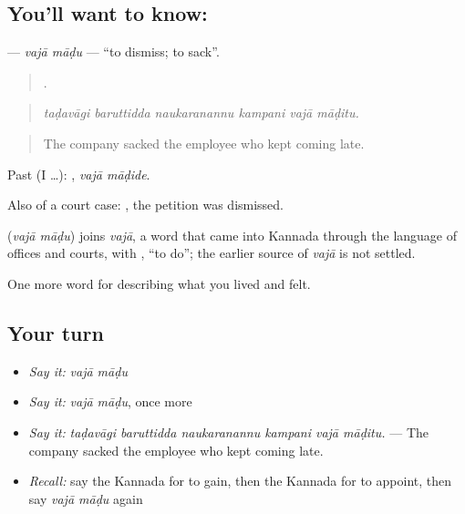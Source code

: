 \subsection*{You'll want to know:  }
\textbf{ } — \emph{vajā māḍu} — \textquotedblleft{}to dismiss; to sack\textquotedblright{}.

\begin{quote}
     .
\end{quote}

\begin{quote}
\emph{taḍavāgi baruttidda naukaranannu kampani vajā māḍitu.}
\end{quote}

\begin{quote}
The company sacked the employee who kept coming late.
\end{quote}

Past (I …):  , \emph{vajā māḍide}.

Also of a court case:   , the petition was dismissed.

\begin{cousinweb}
\textbf{ } (\emph{vajā māḍu}) joins \emph{vajā}, a word that came into Kannada through the language of offices and courts, with , \textquotedblleft{}to do\textquotedblright{}; the earlier source of \emph{vajā} is not settled.
\end{cousinweb}

\begin{grammarlens}[title={What you've built}]
One more word for describing what you lived and felt.
\end{grammarlens}

\subsection*{Your turn}
\begin{itemize}
\raggedright
  \item \emph{Say it:} \emph{vajā māḍu}
  \item \emph{Say it:} \emph{vajā māḍu}, once more
  \item \emph{Say it:} \emph{taḍavāgi baruttidda naukaranannu kampani vajā māḍitu.} — The company sacked the employee who kept coming late.
  \item \emph{Recall:} say the Kannada for to gain, then the Kannada for to appoint, then say \emph{vajā māḍu} again
\end{itemize}

